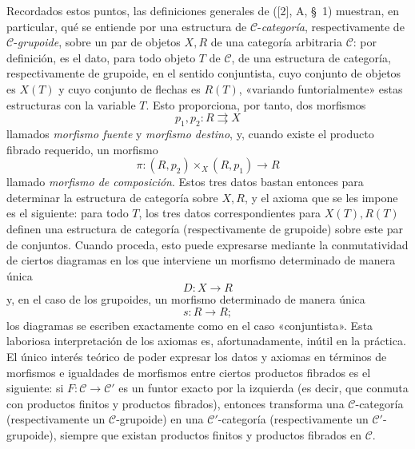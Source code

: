 Recordados estos puntos, las definiciones generales de ([2], A, \S~1)
muestran, en particular, qué se entiende por una estructura de
$\mathcal C$-\emph{categoría}, respectivamente de
$\mathcal C$-\emph{grupoide}, sobre un par de objetos $X,R$ de una categoría
arbitraria $\mathcal C$: por definición, es el dato, para todo objeto $T$ de
$\mathcal C$, de una estructura de categoría, respectivamente de grupoide, en
el sentido conjuntista, cuyo conjunto de objetos es $X(T)$ y cuyo conjunto de
flechas es $R(T)$, «variando funtorialmente» estas estructuras con la variable
$T$. Esto proporciona, por tanto, dos morfismos
\[
  p_1,p_2:R\rightrightarrows X
\]
llamados \emph{morfismo fuente} y \emph{morfismo destino}, y, cuando existe el
producto fibrado requerido, un morfismo
\[
  \pi:(R,p_2)\times_X(R,p_1)\longrightarrow R
\]
llamado \emph{morfismo de composición}. Estos tres datos bastan entonces para
determinar la estructura de categoría sobre $X,R$, y el axioma que se les
impone es el siguiente: para todo $T$, los tres datos correspondientes para
$X(T),R(T)$ definen una estructura de categoría (respectivamente de grupoide)
sobre este par de conjuntos. Cuando proceda, esto puede expresarse mediante
la conmutatividad de ciertos diagramas en los que interviene un morfismo
determinado de manera única
\[
  D:X\longrightarrow R
\]
y, en el caso de los grupoides, un morfismo determinado de manera única
\[
  s:R\longrightarrow R;
\]
los diagramas se escriben exactamente como en el caso «conjuntista». Esta
laboriosa interpretación de los axiomas es, afortunadamente, inútil en la
práctica. El único interés teórico de poder expresar los datos y axiomas en
términos de morfismos e igualdades de morfismos entre ciertos productos
fibrados es el siguiente: si $F:\mathcal C\to\mathcal C'$ es un funtor exacto
por la izquierda (es decir, que conmuta con productos finitos y productos
fibrados), entonces transforma una $\mathcal C$-categoría (respectivamente un
$\mathcal C$-grupoide) en una $\mathcal C'$-categoría (respectivamente un
$\mathcal C'$-grupoide), siempre que existan productos finitos y productos
fibrados en $\mathcal C$.


